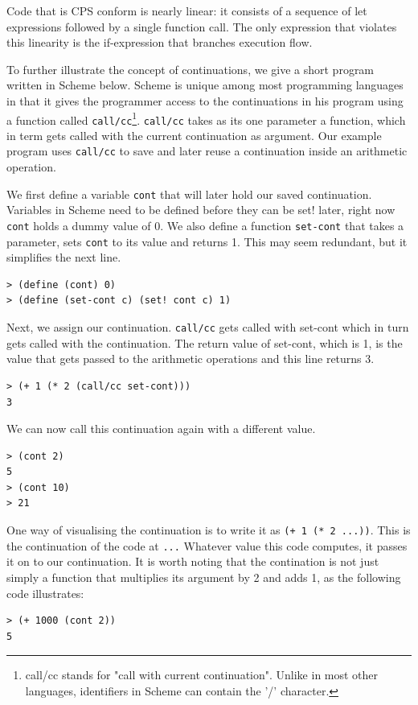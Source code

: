 \documentclass[11pt]{report}
\begin{document}
Code that is CPS conform is nearly linear: it consists of a sequence of let expressions followed by a single function call. The only expression that violates this linearity is the if-expression that branches execution flow.

To further illustrate the concept of continuations, we give a short program written in Scheme below. Scheme is unique among most programming languages in that it gives the programmer access to the continuations in his program using a function called \texttt{call/cc}\footnote{call/cc stands for "call with current continuation". Unlike in most other languages, identifiers in Scheme can contain the '/' character.}. \texttt{call/cc} takes as its one parameter a function, which in term gets called with the current continuation as argument. Our example program uses \texttt{call/cc} to save and later reuse a continuation inside an arithmetic operation.

We first define a variable \texttt{cont} that will later hold our saved continuation. Variables in Scheme need to be defined before they can be set! later, right now \texttt{cont} holds a dummy value of 0. We also define a function \texttt{set-cont} that takes a parameter, sets \texttt{cont} to its value and returns 1. This may seem redundant, but it simplifies the next line.
\begin{lstlisting}
> (define (cont) 0)
> (define (set-cont c) (set! cont c) 1)
\end{lstlisting}

Next, we assign our continuation. \texttt{call/cc} gets called with set-cont which in turn gets called with the continuation. The return value of set-cont, which is 1, is the value that gets passed to the arithmetic operations and this line returns 3.
\begin{lstlisting}
> (+ 1 (* 2 (call/cc set-cont)))
3
\end{lstlisting}

We can now call this continuation again with a different value.
\begin{lstlisting}
> (cont 2)
5
> (cont 10)
> 21
\end{lstlisting}

One way of visualising the continuation is to write it as \texttt{(+ 1 (* 2 ...))}. This is the continuation of the code at \texttt{...} Whatever value this code computes, it passes it on to our continuation. It is worth noting that the contination is not just simply a function that multiplies its argument by 2 and adds 1, as the following code illustrates:
\begin{lstlisting}
> (+ 1000 (cont 2))
5
\end{lstlisting}
\end{document}
